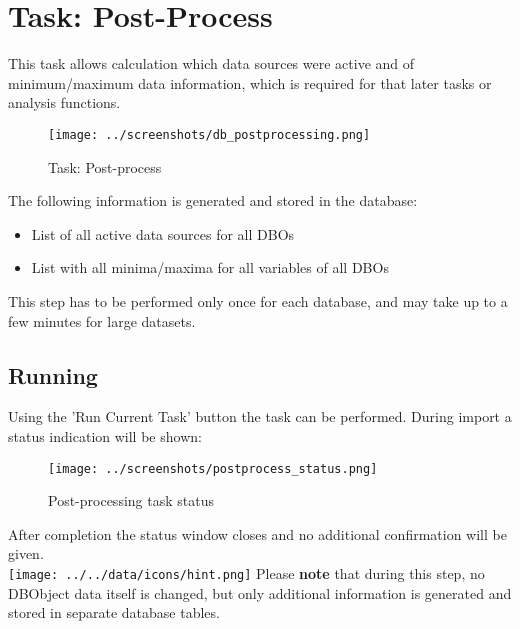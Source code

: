 \section{Task: Post-Process} 
\label{sec:task_postprocess}

This task allows calculation which data sources were active and of minimum/maximum data information, which is required for that later tasks or analysis functions.

\begin{figure}[H]
  \hspace*{-2.5cm}
    \texttt{[image: ../screenshots/db\_postprocessing.png]}
  \caption{Task: Post-process}
\end{figure}

The following information is generated and stored in the database:

\begin{itemize}  
\item List of all active data sources for all DBOs
\item List with all minima/maxima for all variables of all DBOs
\end{itemize}

This step has to be performed only once for each database, and may take up to a few minutes for large datasets. \\

\subsection{Running}

Using the 'Run Current Task' button the task can be performed. During import a status indication will be shown:

\begin{figure}[H]
  \center
    \texttt{[image: ../screenshots/postprocess\_status.png]}
  \caption{Post-processing task status}
\end{figure}

After completion the status window closes and no additional confirmation will be given. \\

\texttt{[image: ../../data/icons/hint.png]} Please \textbf{note} that during this step, no DBObject data itself is changed, but only additional information is generated and stored in separate database tables.
